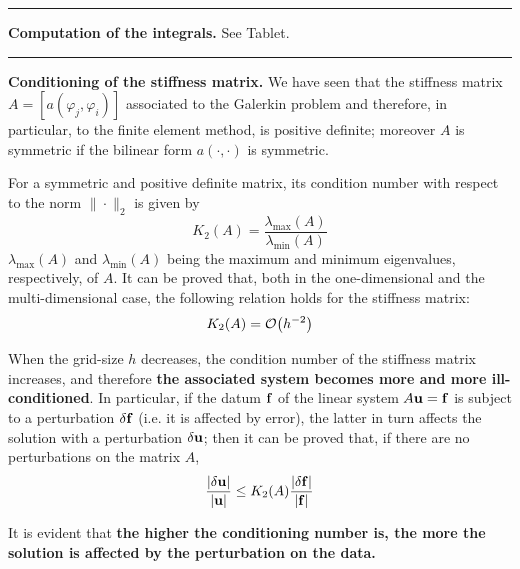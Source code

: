 \rule{0.47\textwidth}{0.2pt}\smallskip

\textbf{Computation of the integrals.} See Tablet.

\bigskip

\rule{0.47\textwidth}{0.2pt}\smallskip

\textbf{Conditioning of the stiffness matrix.} We have seen that the stiffness matrix $A = \left[ a(\varphi_j, \varphi_i) \right]$ associated to the Galerkin problem and therefore, in particular, to the finite element method, is positive definite; moreover $A$ is symmetric if the bilinear form $a(\cdot, \cdot)$ is symmetric.

\smallskip

For a symmetric and positive definite matrix, its condition number with respect to the norm $\|\cdot\|_2$ is given by
\begin{equation}
\label{eq:tocond}
K_2(A) = \frac{\lambda_{\text{max}}(A)}{\lambda_{\text{min}}(A)}
\end{equation}
$\lambda_{\text{max}}(A)$ and $\lambda_{\text{min}}(A)$ being the maximum and minimum eigenvalues, respectively, of $A$. It can be proved that, both in the one-dimensional and the multi-dimensional case, the following relation holds for the stiffness matrix:
\begin{equation*}
K_2(A) = \mathcal{O} \big(h^{-2}\big)
\end{equation*}

When the grid-size $h$ decreases, the condition number of the stiffness matrix increases, and therefore \textbf{the associated system becomes more and more ill-conditioned}. In particular, if the datum $\mathbf{f}$ of the linear system $A\mathbf{u}=\mathbf{f}$ is subject to a perturbation $\delta \mathbf{f}$ (i.e. it is affected by error), the latter in turn affects the solution with a perturbation $\delta \mathbf{u}$; then it can be proved that, if there are no perturbations on the matrix $A$,
\begin{equation*}
\frac{|\delta \mathbf{u}|}{|\mathbf{u}|} \leq K_2(A) \frac{|\delta \mathbf{f}|}{|\mathbf{f}|}
\end{equation*}

It is evident that \textbf{the higher the conditioning number is, the more the solution is affected by the perturbation on the data.}

\smallskip

